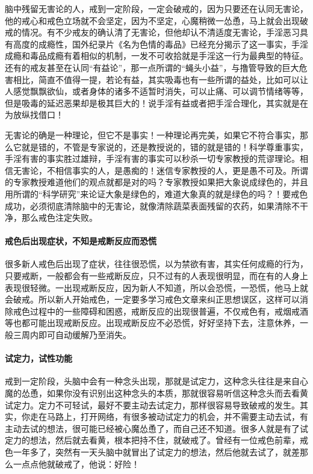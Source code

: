 脑中残留无害论的人，戒到一定阶段，一定会破戒的，因为只要还在认同无害论，他的戒心和戒色立场就不会坚定，因为不坚定，心魔稍微一怂恿，马上就会出现破戒的情况。有不少戒友的确认清了无害论，但他却认不清适度无害论，手淫恶习具有高度的成瘾性，国外纪录片《名为色情的毒品》已经充分揭示了这一事实，手淫成瘾和毒品成瘾有着相似的机制，一发不可收拾就是手淫这一行为最典型的特征。还有的戒友甚至在认同“有益论”，那一点所谓的“蝇头小益”，与撸管导致的巨大危害相比，简直不值得一提，若论有益，其实吸毒也有一些所谓的益处，比如可以让人感觉飘飘欲仙，或者身体的诸多不适暂时消失，可以止痛、可以调节情绪等等，但是吸毒的延迟恶果却是极其巨大的！说手淫有益或者把手淫合理化，其实就是在为放纵找借口！

无害论的确是一种理论，但它不是事实！一种理论再完美，如果它不符合事实，那么它就是错的，不管是专家说的，还是教授说的，错的就是错的！科学尊重事实，手淫有害的事实胜过雄辩，手淫有害的事实可以秒杀一切专家教授的荒谬理论。相信无害论，不相信事实的人，是愚痴的！迷信专家教授的人，更是愚不可及。所谓的专家教授难道他们的观点就都是对的吗？专家教授如果把大象说成绿色的，并且用所谓的“科学研究”来论证大象是绿色的，难道大象真的就是绿色的吗？！要戒色成功，必须彻底清除脑中的无害论，就像清除蔬菜表面残留的农药，如果清除不干净，那么戒色注定失败。

\paragraph{戒色后出现症状，不知是戒断反应而恐慌}

很多新人戒色后出现了症状，往往很恐慌，以为禁欲有害，其实任何成瘾的行为，只要戒断，一般都会有一些戒断反应，只不过有的人表现很明显，而在有的人身上表现很轻微。一出现戒断反应，因为新人不知道，所以会恐慌，一恐慌，他马上就会破戒。所以新人开始戒色，一定要多学习戒色文章来纠正思想误区，这样可以消除戒色过程中的一些障碍和困惑，戒断反应的出现很普遍，不仅戒色有，戒烟戒酒等也都可能出现戒断反应。出现戒断反应不必恐慌，好好坚持下去，注意休养，一般三周内即可自动缓解乃至消失。

\paragraph{试定力，试性功能}

戒到一定阶段，头脑中会有一种念头出现，那就是试定力，这种念头往往是来自心魔的怂恿，如果你没有识别出这种念头的本质，那就很容易听信这种念头而去看黄试定力。定力不可轻试，最好不要主动去试定力，那样很容易导致破戒的发生。其实，你走在马路上，打开网络，有很多被动试定力的机会，并不需要主动去试，有主动去试的想法，很可能已经被心魔怂恿了，而自己还不知道。很多人就是有了试定力的想法，然后就去看黄，根本把持不住，就破戒了。曾经有一位戒色前辈，戒色一年多了，突然有一天头脑中就冒出了试定力的想法，然后他就去试了，就差那么一点点他就破戒了，他说：好险！

